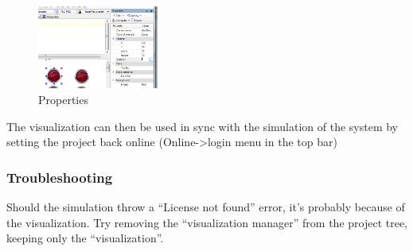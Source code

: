 \documentclass[10pt,a4paper]{article}
\begin{document}
\begin{figure}[h!]
	\begin{center}
		\includegraphics[width=150px]{img12.png}
	\end{center}
\caption{Properties}
\label{fig:prop}
\end{figure}

The visualization can then be used in sync with the simulation of the system by setting the project back online (Online->login menu in the top bar)

\subsubsection{Troubleshooting}
Should the simulation throw a ``License not found'' error, it's probably because of the visualization.
Try removing the ``visualization manager'' from the project tree, keeping only the ``visualization''.
\end{document}
